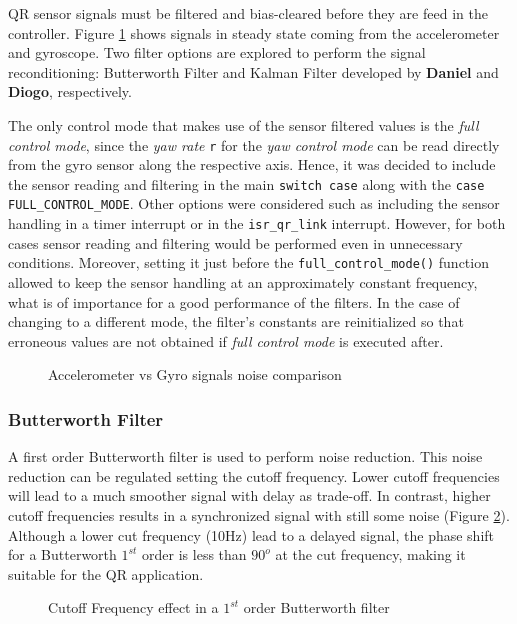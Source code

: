\documentclass{article}
\begin{document}
QR sensor signals must be filtered and bias-cleared before they are feed in the controller. Figure \ref{fig.Noise} shows signals in steady state coming from the accelerometer and gyroscope. Two filter options are explored to perform the signal reconditioning: Butterworth Filter and Kalman Filter developed by \textbf{Daniel} and \textbf{Diogo}, respectively.

The only control mode that makes use of the sensor filtered values is the \textit{full control mode}, since the \textit{yaw rate} \texttt{r} for the \textit{yaw control mode} can be read directly from the gyro sensor along the respective axis. Hence, it was decided to include the sensor reading and filtering in the main \texttt{switch case} along with the \texttt{case FULL\_CONTROL\_MODE}. Other options were considered such as including the sensor handling in a timer interrupt or in the \texttt{isr\_qr\_link} interrupt. However, for both cases sensor reading and filtering would be performed even in unnecessary conditions. Moreover, setting it just before the \texttt{full\_control\_mode()} function allowed to keep the sensor handling at an approximately constant frequency, what is of importance for a good performance of the filters. In the case of changing to a different mode, the filter's constants are reinitialized so that erroneous values are not obtained if \textit{full control mode} is executed after.

\begin{figure}[ht]
\centering
	\caption{Accelerometer vs Gyro signals noise comparison}
	\label{fig.Noise}
\end{figure}

\subsubsection{Butterworth Filter}

A first order Butterworth filter is used to perform noise reduction. This noise reduction can be regulated setting the cutoff frequency. Lower cutoff frequencies will lead to a much smoother signal with delay as trade-off. In contrast, higher cutoff frequencies results in a synchronized signal with still some noise (Figure \ref{fig.NoiseComp}). Although a lower cut frequency (10Hz) lead to a delayed signal, the phase shift for a Butterworth $1^{st}$ order is less than $90^{o}$ at the cut frequency, making it suitable for the QR application. 

\begin{figure}[ht]
\centering
	\caption{Cutoff Frequency effect in a $1^{st}$ order Butterworth filter}
	\label{fig.NoiseComp}
\end{figure}
\end{document}
